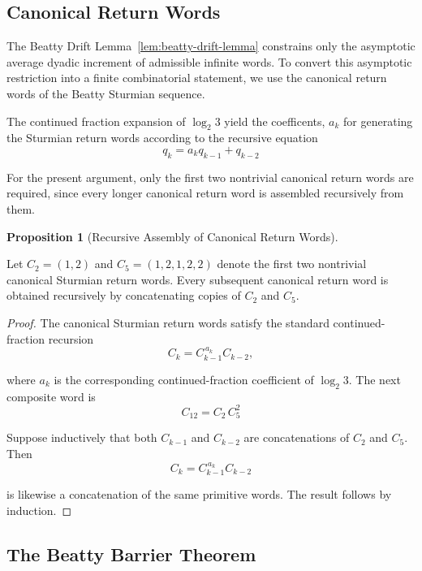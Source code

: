 \documentclass[12pt, oneside]{article}
\numberwithin{equation}{section}
\theoremstyle{definition}
\newtheorem{proposition}{Proposition}[section]
\theoremstyle{plain}
\theoremstyle{remark}
\begin{document}
\subsection{Canonical Return Words}

The Beatty Drift Lemma~\ref{lem:beatty-drift-lemma} constrains only the
asymptotic average dyadic increment of admissible infinite words. To convert
this asymptotic restriction into a finite combinatorial statement, we use the
canonical return words of the Beatty Sturmian sequence.

The continued fraction expansion of \(\log_2 3\) yield the coefficents, \(a_k\) for
generating the Sturmian return words according to the recursive equation
\[
q_{k} = a_k q_{k-1} + q_{k-2}
\]

For the present argument, only the first two nontrivial canonical return words are
required, since every longer canonical return word is assembled recursively from them.

\begin{proposition}[Recursive Assembly of Canonical Return Words]
\label{prop:recursive-assembly}

Let \(C_2=(1,2)\) and
\(C_5=(1,2,1,2,2)\)
denote the first two nontrivial canonical Sturmian return words.
Every subsequent canonical return word is obtained recursively by
concatenating copies of \(C_2\) and \(C_5\).
\end{proposition}

\begin{proof}

The canonical Sturmian return words satisfy the standard continued-fraction
recursion
\[
C_k=C_{k-1}^{\,a_k}C_{k-2},
\]

where \(a_k\) is the corresponding continued-fraction coefficient of
\(\log_2 3\). The next composite word is
\[
C_{12}=C_2\,C_{5}^2
\]

Suppose inductively that both \(C_{k-1}\) and \(C_{k-2}\)
are concatenations of \(C_2\) and \(C_5\). Then
\[
C_k=C_{k-1}^{\,a_k}C_{k-2}
\]

is likewise a concatenation of the same primitive words.
The result follows by induction.
\end{proof}


\subsection{The Beatty Barrier Theorem}
\end{document}
